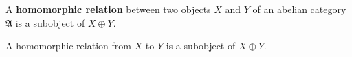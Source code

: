 A \textbf{homomorphic relation} between two objects $X$ and $Y$ of an abelian category $\mathfrak{A}$ is a subobject of $X \oplus Y$.

A homomorphic relation from $X$ to $Y$ is a subobject of $X \oplus Y$.
